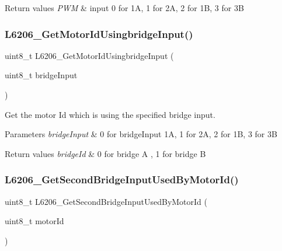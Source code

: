\begin{DoxyRetVals}{Return values}
{\em P\+WM} & input 0 for 1A, 1 for 2A, 2 for 1B, 3 for 3B \\
\hline
\end{DoxyRetVals}
\mbox{\label{group___l6206___private__functions_ga8e21b9719302c02b7044178cd4d93d97}} 
\subsubsection{\texorpdfstring{L6206\+\_\+\+Get\+Motor\+Id\+Usingbridge\+Input()}{L6206\_GetMotorIdUsingbridgeInput()}}
{\footnotesize\ttfamily uint8\+\_\+t L6206\+\_\+\+Get\+Motor\+Id\+Usingbridge\+Input (\begin{DoxyParamCaption}\item[{uint8\+\_\+t}]{bridge\+Input }\end{DoxyParamCaption})}



Get the motor Id which is using the specified bridge input. 


\begin{DoxyParams}{Parameters}
{\em bridge\+Input} & 0 for bridge\+Input 1A, 1 for 2A, 2 for 1B, 3 for 3B \\
\hline
\end{DoxyParams}

\begin{DoxyRetVals}{Return values}
{\em bridge\+Id} & 0 for bridge A , 1 for bridge B \\
\hline
\end{DoxyRetVals}
\mbox{\label{group___l6206___private__functions_gab3eaf311ee61a8f3ab177db80f5d7698}} 
\subsubsection{\texorpdfstring{L6206\+\_\+\+Get\+Second\+Bridge\+Input\+Used\+By\+Motor\+Id()}{L6206\_GetSecondBridgeInputUsedByMotorId()}}
{\footnotesize\ttfamily uint8\+\_\+t L6206\+\_\+\+Get\+Second\+Bridge\+Input\+Used\+By\+Motor\+Id (\begin{DoxyParamCaption}\item[{uint8\+\_\+t}]{motor\+Id }\end{DoxyParamCaption})}



